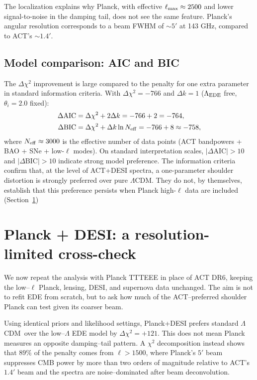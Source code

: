 \documentclass[twocolumn,showpacs,preprintnumbers,amsmath,amssymb,prd]{revtex4-2}
\newcommand{\lcdm}{$\Lambda$CDM}
\begin{document}
The localization explains why Planck, with effective $\ell_{\rm max} 
\approx 2500$ and lower signal-to-noise in the damping tail, does not see 
the same feature. Planck's angular resolution corresponds to a beam FWHM 
of $\sim 5'$ at 143 GHz, compared to ACT's $\sim 1.4'$.

\subsection{Model comparison: AIC and BIC}
\label{sec:aic_bic}

The $\Delta\chi^2$ improvement is large compared to the penalty for one 
extra parameter in standard information criteria. With $\Delta\chi^2 = -766$ 
and $\Delta k = 1$ ($\Lambda_{\rm EDE}$ free, $\theta_i = 2.0$ fixed):
\begin{align}
\Delta\text{AIC} &= \Delta\chi^2 + 2\Delta k = -766 + 2 = -764, \\
\Delta\text{BIC} &= \Delta\chi^2 + \Delta k \ln N_{\rm eff} = -766 + 8 \approx -758,
\end{align}
where $N_{\rm eff} \approx 3000$ is the effective number of data points 
(ACT bandpowers + BAO + SNe + low-$\ell$ modes). On standard interpretation 
scales, $|\Delta\text{AIC}| > 10$ and $|\Delta\text{BIC}| > 10$ indicate 
strong model preference. The information criteria confirm that, at the level 
of ACT+DESI spectra, a one-parameter shoulder distortion is strongly preferred 
over pure \lcdm. They do not, by themselves, establish that this preference 
persists when Planck high-$\ell$ data are included (Section~\ref{sec:planck})

\section{Planck + DESI: a resolution-limited cross-check}
\label{sec:planck}

We now repeat the analysis with Planck TTTEEE in place of ACT DR6, keeping the
low--$\ell$ Planck, lensing, DESI, and supernova data unchanged. The aim is not
to refit EDE from scratch, but to ask how much of the ACT--preferred shoulder
Planck can test given its coarser beam.

Using identical priors and likelihood settings, Planck+DESI prefers standard
\lcdm\ over the low--$\Lambda$ EDE model by $\Delta\chi^2 = +121$. This does
not mean Planck measures an opposite damping--tail pattern. A $\chi^2$
decomposition instead shows that $89\%$ of the penalty comes from
$\ell > 1500$, where Planck's $5'$ beam suppresses CMB power by more than two
orders of magnitude relative to ACT's $1.4'$ beam and the spectra are
noise--dominated after beam deconvolution.
\end{document}
